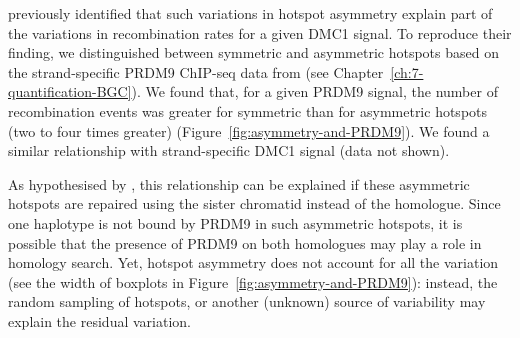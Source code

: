 \citet{li2018highresolution} previously identified that such variations in hotspot asymmetry explain part of the variations in recombination rates for a given DMC1 signal.
To reproduce their finding, we distinguished between symmetric and asymmetric hotspots based on the strand-specific PRDM9 ChIP-seq data from \citet{baker2015prdm9} (see Chapter~\ref{ch:7-quantification-BGC}).
We found that, for a given PRDM9 signal, the number of recombination events was greater for symmetric than for asymmetric hotspots (two to four times greater) (Figure~\ref{fig:asymmetry-and-PRDM9}).
We found a similar relationship with strand-specific DMC1 signal (data not shown).

As hypothesised by \citet{li2018highresolution}, this relationship can be explained if these asymmetric hotspots are repaired using the sister chromatid instead of the homologue.
Since one haplotype is not bound by PRDM9 in such asymmetric hotspots, it is possible that the presence of PRDM9 on both homologues may play a role in homology search.
Yet, hotspot asymmetry does not account for all the variation (see the width of boxplots in Figure~\ref{fig:asymmetry-and-PRDM9}): instead, the random sampling of hotspots, or another (unknown) source of variability may explain the residual variation.


